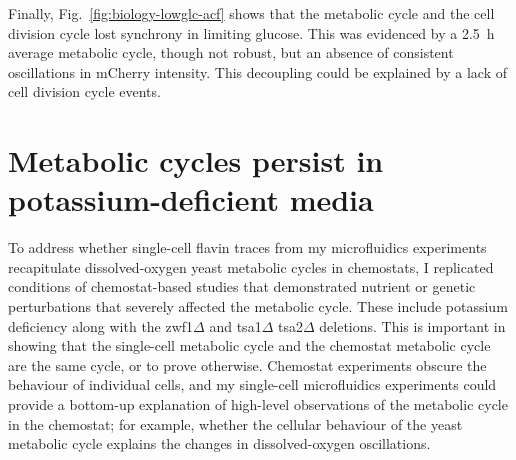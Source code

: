 Finally, Fig.\ \ref{fig:biology-lowglc-acf} shows that the metabolic cycle and the cell division cycle lost synchrony in limiting glucose.
This was evidenced by a \SI{2.5}{\hour} average metabolic cycle, though not robust, but an absence of consistent oscillations in mCherry intensity.
This decoupling could be explained by a lack of cell division cycle events.




\section{Metabolic cycles persist in potassium-deficient media}
\label{sec:biology-potassium_deficient}

To address whether single-cell flavin traces from my microfluidics experiments recapitulate dissolved-oxygen yeast metabolic cycles in chemostats, I replicated conditions of chemostat-based studies that demonstrated nutrient or genetic perturbations that severely affected the metabolic cycle.
These include potassium deficiency along with the zwf1$\Delta$ and tsa1$\Delta$ tsa2$\Delta$ deletions.
This is important in showing that the single-cell metabolic cycle and the chemostat metabolic cycle are the same cycle, or to prove otherwise.
Chemostat experiments obscure the behaviour of individual cells, and
my single-cell microfluidics experiments could provide a bottom-up explanation of high-level observations of the metabolic cycle in the chemostat; for example, whether the cellular behaviour of the yeast metabolic cycle explains the changes in dissolved-oxygen oscillations.


